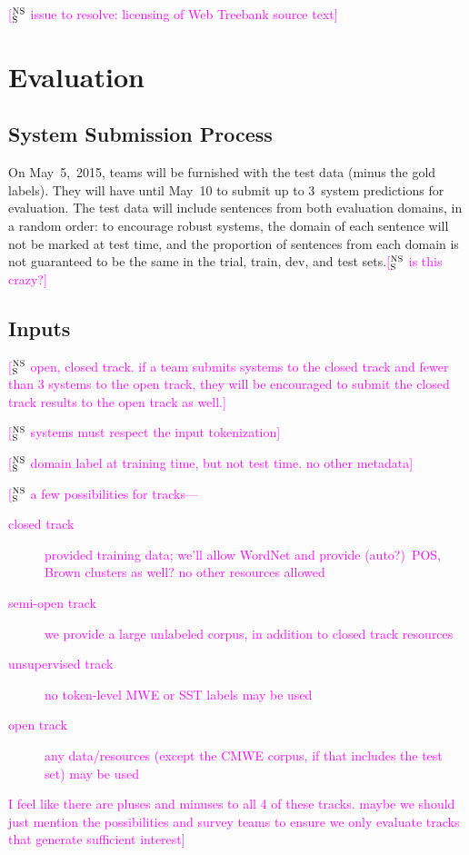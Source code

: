 \documentclass[11pt]{article}
\newcommand{\ensuretext}[1]{#1}
\newcommand{\nssmarker}{\ensuretext{\textcolor{magenta}{\ensuremath{^{\textsc{NS}}_{\textsc{S}}}}}}
\newcommand{\arkcomment}[3]{\ensuretext{\textcolor{#3}{[#1 #2]}}}
\newcommand{\nss}[1]{\arkcomment{\nssmarker}{#1}{magenta}}
\begin{document}
\nss{issue to resolve: licensing of Web Treebank source text}

\section{Evaluation}

\subsection{System Submission Process}

On May~5,~2015, teams will be furnished with the test data (minus the gold labels). 
They will have until May~10 to submit up to 3~system predictions for evaluation. 
The test data will include sentences from both evaluation domains, 
in a random order: to encourage robust systems, 
the domain of each sentence will not be marked at test time, 
and the proportion of sentences from each domain is not guaranteed to be 
the same in the trial, train, dev, and test sets.\nss{is this crazy?}

\subsection{Inputs}

\nss{open, closed track. if a team submits systems to the closed track and fewer than 3 systems to the open track, 
they will be encouraged to submit the closed track results to the open track as well.}

\nss{systems must respect the input tokenization}

\nss{domain label at training time, but not test time. no other metadata}

\nss{a few possibilities for tracks---
\begin{description}
\item[closed track] provided training data; we'll allow WordNet and provide (auto?)~POS, Brown clusters as well? 
no other resources allowed
\item[semi-open track] we provide a large unlabeled corpus, in addition to closed track resources
\item[unsupervised track] no token-level MWE or SST labels may be used
\item[open track] any data/resources (except the CMWE corpus, if that includes the test set) may be used
\end{description}
I feel like there are pluses and minuses to all 4 of these tracks. maybe we should just mention the possibilities 
and survey teams to ensure we only evaluate tracks that generate sufficient interest}
\end{document}
